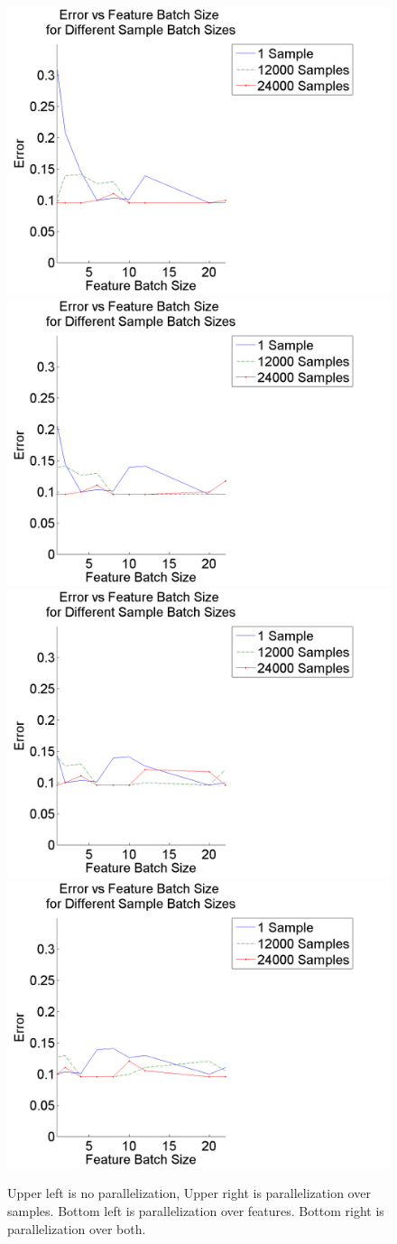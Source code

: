 \documentclass{article}
\begin{document}
\begin{figure}
\centering
\includegraphics[width = .4\linewidth]{featerrplot6}
\includegraphics[width = .4\linewidth]{featerrplot8}
\includegraphics[width = .4\linewidth]{featerrplot10}
\includegraphics[width = .4\linewidth]{featerrplot12}
\caption{Upper left is no parallelization, Upper right is parallelization over samples. Bottom left is parallelization over features. Bottom right is parallelization over both.}
\end{figure}
\end{document}
